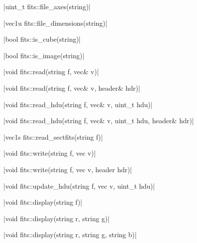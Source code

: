 \funcitem \cppinline|uint_t fits::file_axes(string)| 

\funcitem \cppinline|vec1u fits::file_dimensions(string)| 

\funcitem \cppinline|bool fits::is_cube(string)| 

\funcitem \cppinline|bool fits::is_image(string)| 

\funcitem \cppinline|void fits::read(string f, vec& v)| 

\cppinline|void fits::read(string f, vec& v, header& hdr)|

\cppinline|void fits::read_hdu(string f, vec& v, uint_t hdu)| 

\cppinline|void fits::read_hdu(string f, vec& v, uint_t hdu, header& hdr)|

\funcitem \cppinline|vec1s fits::read_sectfits(string f)| 

\funcitem \cppinline|void fits::write(string f, vec v)| 

\cppinline|void fits::write(string f, vec v, header hdr)|

\funcitem \cppinline|void fits::update_hdu(string f, vec v, uint_t hdu)| 

\funcitem \cppinline|void fits::display(string f)| 

\cppinline|void fits::display(string r, string g)|

\cppinline|void fits::display(string r, string g, string b)|
